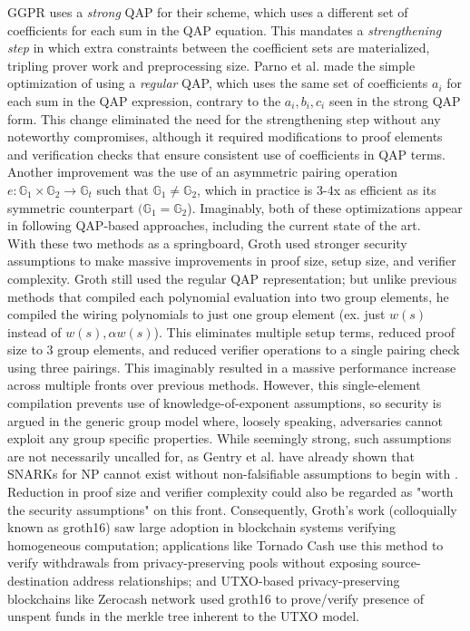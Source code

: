 \noindent GGPR uses a \textit{strong} QAP for their scheme, which uses a different set of coefficients for each sum in the QAP equation. This mandates a \textit{strengthening step} in which extra constraints between the coefficient sets are materialized, tripling prover work and preprocessing size. Parno et al. \cite{pinocchio} made the simple optimization of using a \textit{regular} QAP, which uses the same set of coefficients $a_i$ for each sum in the QAP expression, contrary to the $a_i, b_i, c_i$ seen in the strong QAP form. This change eliminated the need for the strengthening step without any noteworthy compromises, although it required modifications to proof elements and verification checks that ensure consistent use of coefficients in QAP terms. Another improvement was the use of an asymmetric pairing operation $e: \mathbb{G}_1 \times \mathbb{G}_2 \to \mathbb{G}_t$ such that $\mathbb{G}_1 \ne \mathbb{G}_2$, which in practice is 3-4x as efficient as its symmetric counterpart $(\mathbb{G}_1 = \mathbb{G}_2$). Imaginably, both of these optimizations appear in following QAP-based approaches, including the current state of the art.\\

\noindent With these two methods as a springboard, Groth \cite{groth16} used stronger security assumptions to make massive improvements in proof size, setup size, and verifier complexity. Groth still used the regular QAP representation; but unlike previous methods that compiled each polynomial evaluation into two group elements, he compiled the wiring polynomials to just one group element (ex. just $w(s)$ instead of $w(s), \alpha w(s)$). This eliminates multiple setup terms, reduced proof size to 3 group elements, and reduced verifier operations to a single pairing check using three pairings. This imaginably resulted in a massive performance increase across multiple fronts over previous methods. However, this single-element compilation prevents use of knowledge-of-exponent assumptions, so security is argued in the generic group model where, loosely speaking, adversaries cannot exploit any group specific properties. While seemingly strong, such assumptions are not necessarily uncalled for, as Gentry et al. have already shown that SNARKs for NP cannot exist without non-falsifiable assumptions to begin with \cite{nonfalsifiable}. Reduction in proof size and verifier complexity could also be regarded as "worth the security assumptions" on this front. Consequently, Groth's work (colloquially known as groth16) saw large adoption in blockchain systems verifying homogeneous computation; applications like Tornado Cash \cite{tornadocash} use this method to verify withdrawals from privacy-preserving pools without exposing source-destination address relationships; and UTXO-based privacy-preserving blockchains like Zerocash network \cite{zcash} used groth16 to prove/verify presence of unspent funds in the merkle tree inherent to the UTXO model.

